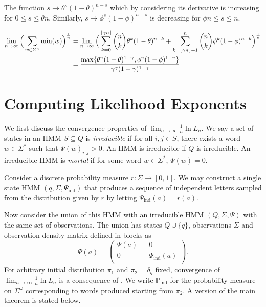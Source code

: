 \documentclass[a4paper,UKenglish,cleveref, autoref,mathscr]{lipics-v2019}
\newcommand{\PP}{\mathbb{P}}
\newcommand{\1}{\mathbbm{1}}
\newcommand{\liexp}{\lim_{n\rightarrow\infty} \frac1n \ln L_n}
\newcommand{\PPind}{\PP_{\text{ind}}}
\DeclarePairedDelimiter\floor{\lfloor}{\rfloor}
\begin{document}
\begin{example}
The function $s \rightarrow \theta^s(1 - \theta)^{n - s}$ which by considering its derivative is increasing for $0 \leq s \leq \theta n$. Similarly, $s \rightarrow \phi^s(1 - \phi)^{n - s}$ is decreasing for $\phi n \leq s \leq n$.


\begin{align*}
\lim_{n \rightarrow \infty} \Big(\sum_{w \in \Sigma^n} \text{min}(w) \Big)^\frac{1}{n} & = \lim_{n \rightarrow \infty} \Big( \sum_{k = 0}^{\floor*{\gamma n}} {n \choose k} \theta^k(1 - \theta)^{n - k} + \sum_{k = \floor*{\gamma n}+1}^{n} {n \choose k} \phi^k(1 - \phi)^{n - k} \Big)^{\frac{1}{n}} \\
& = \frac{ \max \{ \theta^\gamma (1 - \theta)^{1- \gamma}, \phi^\gamma (1 - \phi)^{1- \gamma}\}}{\gamma^\gamma (1 - \gamma)^{1 - \gamma}}
\end{align*}

\section{Computing Likelihood Exponents}\label{seccompdet}

We first discuss the convergence properties of $\liexp$. We say a set of states in an HMM $S \subseteq Q$ is \emph{irreducible} if for all $i,j \in S$, there exists a word $w \in \Sigma^*$ such that $\Psi(w)_{i,j} > 0$. An HMM is irreducible if $Q$ is irreducible. An irreducible HMM is \emph{mortal} if for some word $w \in \Sigma^*$, $\Psi(w) = 0$. 

Consider a discrete probability measure $r : \Sigma \rightarrow [0,1]$. We may construct a single state HMM $(q, \Sigma, \Psi_{\text{ind}})$ that produces a sequence of independent letters sampled from the distribution given by $r$ by letting $\Psi_{\text{ind}}(a) = r(a)$.

Now consider the union of this HMM with an irreducible HMM $(Q, \Sigma, \Psi)$ with the same set of observations. The union has states $Q \cup \{q\}$, observations $\Sigma$ and observation density matrix defined in blocks as 
\begin{equation}
\overline{\Psi}(a)  = \begin{pmatrix}
\Psi(a) && 0\\
0  && \Psi_{\text{ind}}(a)\\
\end{pmatrix}.
\end{equation}
For arbitrary initial distribution $\pi_1$ and $\pi_2 = \delta_q$ fixed, convergence of $\liexp$ is a consequence of \cite{prot13}. We write $\PPind$ for the probability measure on $\Sigma^\omega$ corresponding to words produced starting from $\pi_2$. A version of the main theorem is stated below.


\end{example}
\end{document}
